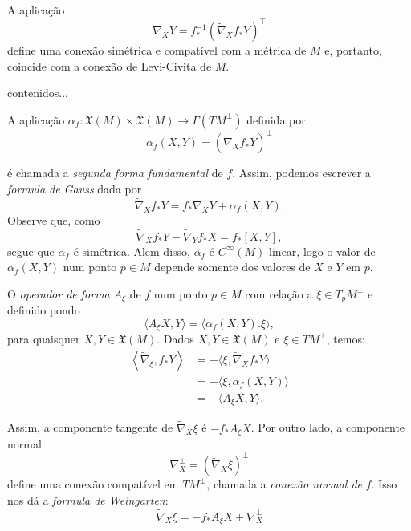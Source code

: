 \begin{proposicao}
	A aplicação
	\begin{equation*}
		\nabla_X Y = f_*^{-1} \left( \tilde{\nabla}_X f_* Y \right)^{\top}
	\end{equation*}
	define uma conexão simétrica e compatível com a métrica de $M$ e, portanto, coincide com a conexão de Levi-Civita de $M$.
\end{proposicao}

\begin{demonstracao}
	contenidos...
\end{demonstracao}

A aplicação $\alpha_f: \mathfrak{X}(M) \times \mathfrak{X}(M) \rightarrow \Gamma(TM^\perp)$ definida por
\begin{equation*}
	\alpha_f(X,Y) = \left( \tilde{\nabla}_X f_* Y \right)^\perp
\end{equation*}

é chamada a \emph{segunda forma fundamental} de $f$. Assim, podemos escrever a \emph{formula de Gauss} dada por
\begin{equation*}
	\tilde{\nabla}_X f_* Y = f_* \nabla_X Y + \alpha_f(X,Y).
\end{equation*}
Observe que, como
\begin{equation*}
	\tilde{\nabla}_X f_* Y - \tilde{\nabla}_Y f_* X = f_* [X,Y],
\end{equation*}
segue que $\alpha_f$ é simétrica. Alem disso, $\alpha_f$ é $C^{\infty}(M)$-linear, logo o valor de $\alpha_f(X,Y)$ num ponto $p \in M$ depende somente dos valores de $X$ e $Y$ em $p$.

O \emph{operador de forma} $A_{\xi}$ de $f$ num ponto $p \in M$ com relação a $\xi \in T_p M^\perp$ e definido pondo
\begin{equation*}
	\langle A_\xi X, Y \rangle = \langle \alpha_f(X,Y). \xi \rangle,
\end{equation*}
para quaisquer $X,Y \in \mathfrak{X}(M)$. Dados $X,Y \in \mathfrak{X}(M)$ e $\xi \in TM^\perp$, temos:
\begin{align*}
	\left\langle \tilde{\nabla}_\xi, f_* Y \right\rangle &= -\langle \xi, \tilde{\nabla}_X f_* Y \rangle\\
	&= - \langle \xi, \alpha_f(X,Y) \rangle\\
	&= - \langle A_\xi X, Y \rangle.
\end{align*}

Assim, a componente tangente de $\tilde{\nabla}_X \xi$ é $-f_* A_\xi X$. Por outro lado, a componente normal
\begin{equation*}
	\nabla_X^\perp = \left( \tilde{\nabla}_X \xi \right)^\perp
\end{equation*}
define uma conexão compatível em $TM^\perp$, chamada a \emph{conexão normal de} $f$. Isso nos dá a \emph{formula de Weingarten}:
\begin{equation}\label{formula_de_weingarten}
	\tilde{\nabla}_X \xi = - f_* A_\xi X + \nabla_X^\perp
\end{equation}

